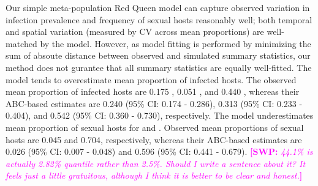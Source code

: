 \documentclass{article}\usepackage[]{graphicx}\usepackage[]{color}
\newcommand{\comment}[3]{\textcolor{#1}{\textbf{[#2: }\textit{#3}\textbf{]}}}
\newcommand{\swp}[1]{\comment{magenta}{SWP}{#1}}
\begin{document}
Our simple meta-population Red Queen model can capture observed variation in infection prevalence and frequency of sexual hosts reasonably well;
both temporal and spatial variation (measured by CV across mean proportions) are well-matched by the model. 
However, as model fitting is performed by minimizing the sum of absoute distance between observed and simulated summary statistics, our method does not gurantee that all summary statistics are equally well-fitted.
The model tends to overestimate mean proportion of infected hosts.
The observed mean proportion of infected hosts are 0.175 \citep{dagan2013clonal}, 0.051 \citep{mckone2016fine}, and 0.440 \citep{vergara2014infection}, 
whereas their ABC-based estimates are 0.240 (95\% CI: 0.174 - 0.286), 0.313 (95\% CI: 0.233 - 0.404), and 0.542 (95\% CI: 0.360 - 0.730), respectively.
The model underestimates mean proportion of sexual hosts for \cite{dagan2013clonal} and \cite{vergara2014infection}.
Observed mean proportions of sexual hosts are 0.045 and 0.704, respectively, whereas their ABC-based estimates are 0.026 (95\% CI: 0.007 - 0.048) and 0.596 (95\% CI: 0.441 - 0.679).
\swp{44.1\% is actually 2.82\% quantile rather than 2.5\%. Should I write a sentence about it? It feels just a little gratuitous, although I think it is better to be clear and honest.}
\end{document}
